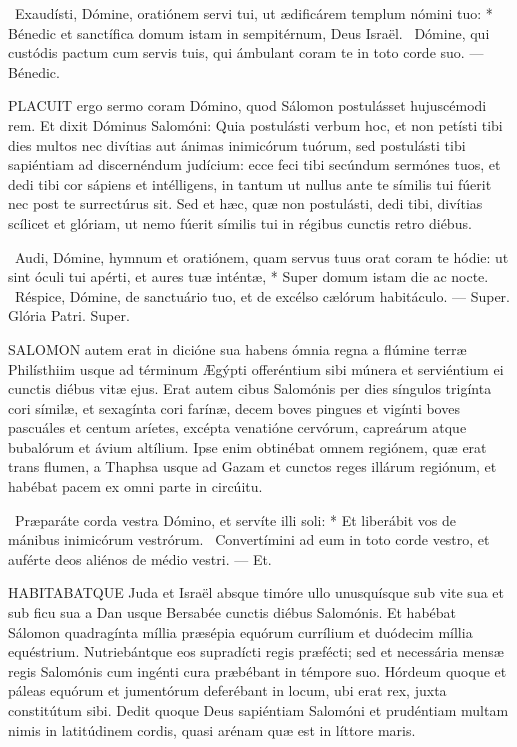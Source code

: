 \R\ Exaudísti, Dómine, oratiónem servi tui, ut ædificárem templum nómini tuo: * Bénedic et sanctífica domum istam in sempitérnum, Deus Israël. \V\ Dómine, qui custódis pactum cum servis tuis, qui ámbulant coram te in toto corde suo. --- Bénedic.



\lettrine[lines=2]{P}{LACUIT} ergo sermo coram Dómino, quod Sálomon postulásset hujuscémodi rem. Et dixit Dóminus Salomóni: Quia postulásti verbum hoc, et non petísti tibi dies multos nec divítias aut ánimas inimicórum tuórum, sed postulásti tibi sapiéntiam ad discernéndum judícium: ecce feci tibi secúndum sermónes tuos, et dedi tibi cor sápiens et intélligens, in tantum ut nullus ante te símilis tui fúerit nec post te surrectúrus sit. Sed et hæc, quæ non postulásti, dedi tibi, divítias scílicet et glóriam, ut nemo fúerit símilis tui in régibus cunctis retro diébus.

\R\ Audi, Dómine, hymnum et oratiónem, quam servus tuus orat coram te hódie: ut sint óculi tui apérti, et aures tuæ inténtæ, * Super domum istam die ac nocte. \V\ Réspice, Dómine, de sanctuário tuo, et de excélso cælórum habitáculo. --- Super. Glória Patri. Super.




\lettrine[lines=2]{S}{ALOMON} autem erat in dicióne sua habens ómnia regna a flúmine terræ Philísthiim usque ad términum Ægýpti offeréntium sibi múnera et serviéntium ei cunctis diébus vitæ ejus. Erat autem cibus Salomónis per dies síngulos trigínta cori símilæ, et sexagínta cori farínæ, decem boves pingues et vigínti boves pascuáles et centum aríetes, excépta venatióne cervórum, capreárum atque bubalórum et ávium altílium. Ipse enim obtinébat omnem regiónem, quæ erat trans flumen, a Thaphsa usque ad Gazam et cunctos reges illárum regiónum, et habébat pacem ex omni parte in circúitu.

\R\ Præparáte corda vestra Dómino, et servíte illi soli: * Et liberábit vos de mánibus inimicórum vestrórum. \V\ Convertímini ad eum in toto corde vestro, et auférte deos aliénos de médio vestri. --- Et.


\lettrine[lines=2]{H}{ABITABATQUE} Juda et Israël absque timóre ullo unusquísque sub vite sua et sub ficu sua a Dan usque Bersabée cunctis diébus Salomónis. Et habébat Sálomon quadragínta míllia præsépia equórum currílium et duódecim míllia equéstrium. Nutriebántque eos supradícti regis præfécti; sed et necessária mensæ regis Salomónis cum ingénti cura præbébant in témpore suo. Hórdeum quoque et páleas equórum et jumentórum deferébant in locum, ubi erat rex, juxta constitútum sibi. Dedit quoque Deus sapiéntiam Salomóni et prudéntiam multam nimis in latitúdinem cordis, quasi arénam quæ est in líttore maris.

